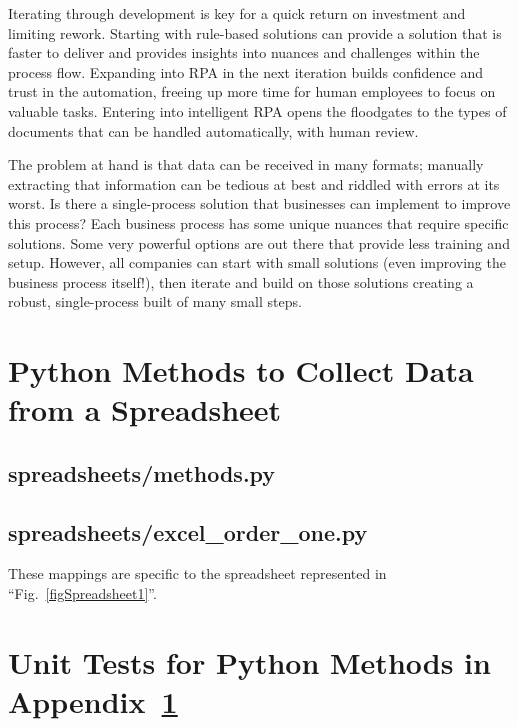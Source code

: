 \documentclass[conference]{IEEEtran}
\begin{document}
Iterating through development is key for a quick return on investment and limiting rework. Starting with rule-based solutions can provide a solution that is faster to deliver and provides insights into nuances and challenges within the process flow. Expanding into RPA in the next iteration builds confidence and trust in the automation, freeing up more time for human employees to focus on valuable tasks. Entering into intelligent RPA opens the floodgates to the types of documents that can be handled automatically, with human review.

The problem at hand is that data can be received in many formats; manually extracting that information can be tedious at best and riddled with errors at its worst. Is there a single-process solution that businesses can implement to improve this process? Each business process has some unique nuances that require specific solutions. Some very powerful options are out there that provide less training and setup. However, all companies can start with small solutions (even improving the business process itself!), then iterate and build on those solutions creating a robust, single-process built of many small steps.




\onecolumn
\appendices

\newpage
\section{Python Methods to Collect Data from a Spreadsheet} \label{appendixOrderOne}
    \subsection{spreadsheets/methods.py}
    

    \newpage
    \subsection{spreadsheets/excel\_order\_one.py}
    These mappings are specific to the spreadsheet represented in ``Fig.~\ref{figSpreadsheet1}''.
    

\newpage
\section{Unit Tests for Python Methods in Appendix~\ref{appendixOrderOne}} \label{appendixOrderOneTests}
\end{document}

